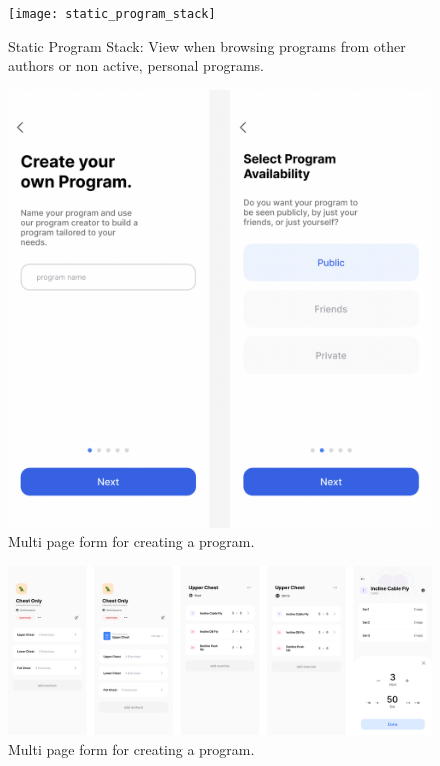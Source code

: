 \documentclass[12pt, titlepage]{article}
\begin{document}
  \begin{figure}[H]
		\centering
		\texttt{[image: static\_program\_stack]}
    \caption{Static Program Stack: View when browsing programs from other authors or non active, personal programs.}
	\end{figure}

  \begin{figure}[H]
		\centering
		\includegraphics[width=\linewidth,keepaspectratio]{create_program_form}
    \caption{Multi page form for creating a program.}
	\end{figure}

  \begin{figure}[H]
		\centering
		\includegraphics[width=\linewidth,keepaspectratio]{active_program_stack}
    \caption{Multi page form for creating a program.}
	\end{figure}
\end{document}
